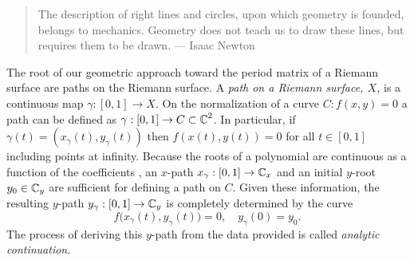 \begin{quote}
  The description of right lines and circles, upon which geometry is founded,
  belongs to mechanics. Geometry does not teach us to draw these lines, but
  requires them to be drawn. --- Isaac Newton
\end{quote}

The root of our geometric approach toward the period matrix of a Riemann surface
are paths on the Riemann surface. A {\it path on a Riemann surface, $X$,} is a
continuous map $\gamma : [0,1] \to X$. On the normalization of a curve $C:
f(x,y) = 0$ a path can be defined as $\gamma : [0,1] \to C \subset \operatorname{\mathbb{C}}^2$. In
particular, if $\gamma(t) = (x_\gamma(t), y_\gamma(t))$ then $f(x(t),y(t)) = 0$
for all $t \in [0,1]$ including points at infinity. Because the roots of a
polynomial are continuous as a function of the coefficients
\cite{HarrisMartin1987}, an $x$-path $x_\gamma : [0,1] \to \operatorname{\mathbb{C}}_x$ and an initial
$y$-root $y_0 \in \operatorname{\mathbb{C}}_y$ are sufficient for defining a path on $C$. Given these
information, the resulting $y$-path $y_\gamma : [0,1] \to \operatorname{\mathbb{C}}_y$ is completely
determined by the curve
\[
  f \big( x_\gamma(t), y_\gamma(t) \big) = 0, \quad y_\gamma(0) = y_0.
\]
The process of deriving this $y$-path from the data provided is called {\it
  analytic continuation}.

